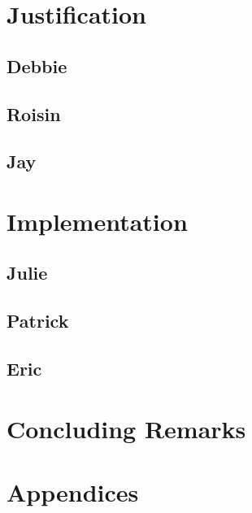\documentclass[10pt]{book} %
\begin{document}
\chapter{Justification}

\section{Debbie}

\section{Roisin}

\section{Jay}

\chapter{Implementation}


\section{Julie}

\section{Patrick}

\section{Eric}



\chapter{Concluding Remarks}

\chapter*{Appendices}


\clearpage



\end{document}
